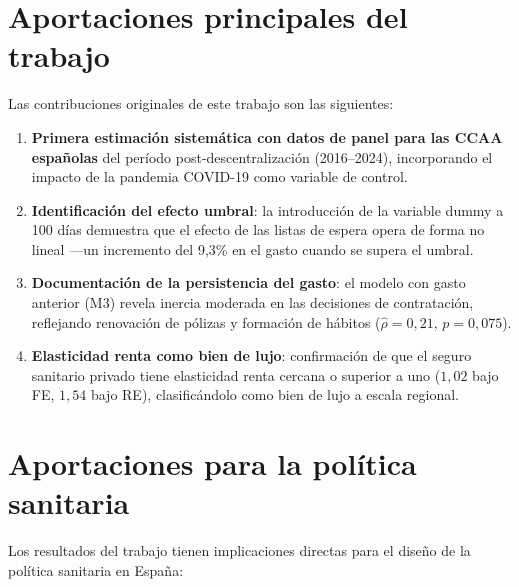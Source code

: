 \section{Aportaciones principales del trabajo}

Las contribuciones originales de este trabajo son las siguientes:

\begin{enumerate}
  \item \textbf{Primera estimación sistemática con datos de panel para las CCAA
    españolas} del período post-descentralización (2016--2024), incorporando el
    impacto de la pandemia COVID-19 como variable de control.
  \item \textbf{Identificación del efecto umbral}: la introducción de la variable
    dummy a 100 días demuestra que el efecto de las listas de espera opera de
    forma no lineal ---un incremento del 9{,}3\% en el gasto cuando se supera el umbral.
  \item \textbf{Documentación de la persistencia del gasto}: el modelo con gasto
    anterior (M3) revela inercia moderada en las decisiones de contratación,
    reflejando renovación de pólizas y formación de hábitos ($\hat{\rho}=0{,}21$,
    $p=0{,}075$).
  \item \textbf{Elasticidad renta como bien de lujo}: confirmación de que
    el seguro sanitario privado tiene elasticidad renta cercana o superior a uno
    ($1{,}02$ bajo FE, $1{,}54$ bajo RE), clasificándolo como bien de lujo a
    escala regional.
\end{enumerate}

\section{Aportaciones para la política sanitaria}

Los resultados del trabajo tienen implicaciones directas para el diseño de la
política sanitaria en España:

